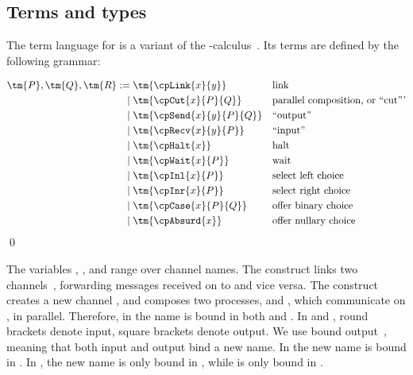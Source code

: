 \documentclass[UKenglish]{llncs}
\begin{document}
\subsection{Terms and types}
\label{sec:cp-terms-and-types}
The term language for \cp is a variant of the
\textpi-calculus~\cite{milner1992b}.
Its terms are defined by the following grammar:
\begin{definition}[Terms]\label{def:cp-terms}
  \[\!
    \begin{aligned}
      \tm{P}, \tm{Q}, \tm{R}
           :=& \; \tm{\cpLink{x}{y}}       &&\text{link}
      \\ \mid& \; \tm{\cpCut{x}{P}{Q}}     &&\text{parallel composition, or ``cut'''}
      \\ \mid& \; \tm{\cpSend{x}{y}{P}{Q}} &&\text{``output''}
      \\ \mid& \; \tm{\cpRecv{x}{y}{P}}    &&\text{``input''}
      \\ \mid& \; \tm{\cpHalt{x}}          &&\text{halt}
      \\ \mid& \; \tm{\cpWait{x}{P}}       &&\text{wait}
      \\ \mid& \; \tm{\cpInl{x}{P}}        &&\text{select left choice}
      \\ \mid& \; \tm{\cpInr{x}{P}}        &&\text{select right choice}
      \\ \mid& \; \tm{\cpCase{x}{P}{Q}}    &&\text{offer binary choice}
      \\ \mid& \; \tm{\cpAbsurd{x}}        &&\text{offer nullary choice}
    \end{aligned}
  \]  
  \qed
\end{definition}
The variables , ,  and  range over channel names.
The construct  links two
channels~\cite{sangiorgi1996,boreale1998}, forwarding messages received on
 to  and vice versa.
The construct  creates a new channel , and composes
two processes,  and , which communicate on , in parallel.
Therefore, in  the name  is bound in both  and
.
In  and , round brackets denote
input, square brackets denote output. 
We use bound output~\cite{sangiorgi1996}, meaning that both input and output
bind a new name. 
In  the new name  is bound in .
In , the new name  is only bound in , while
 is only bound in .
\end{document}
